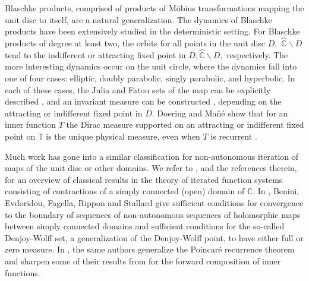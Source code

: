 \documentclass[12pt,reqno]{amsart}
\numberwithin{theorem}{section}
\begin{document}
Blaschke products, comprised of products of Möbius transformations mapping the unit disc to itself, are a natural generalization. The dynamics of Blaschke products have been extensively studied in the deterministic setting. For Blaschke products of degree at least two, the orbits for all points in the unit disc $D,$ $\hat{\mathbb{C}}\backslash\overline{D}$ tend to the indifferent or attracting fixed point in $\overline{D}, \hat{\mathbb{C}}\backslash D,$ respectively. The more interesting dynamics occur on the unit circle, where the dynamics fall into one of four cases: elliptic, doubly parabolic, singly parabolic, and hyperbolic. In each of these cases, the Julia and Fatou sets of the map  can be explicitly described \cite{baker_domains2, baker_domains,  parabolic, fletcher}, and an invariant measure can be constructed \cite{ergodic_inner_function, martin, expandPujals}, depending on the attracting or indifferent fixed point in $\overline{D}$. Doering and Mañé show that for an inner function $T$ the Dirac measure supported on an attracting or indifferent fixed point on $\mathbb{T}$ is the unique physical measure, even when $T$ is recurrent \cite{Mane1991}.

Much work has gone into a similar classification for non-autonomous iteration of maps of the unit disc or other domains. We refer to \cite{beardon, keen_lakic, lorentzen, lorentzen2}, and the references therein, for an overview of classical results in the theory of iterated function systems consisting of contractions of a simply connected (open) domain of $\mathbb{C}.$ In \cite{benini_1}, Benini, Evdoridou, Fagella, Rippon and Stallard give sufficient conditions for convergence to the boundary of sequences of non-autonomous sequences of holomorphic maps between simply connected domains and sufficient conditions for the so-called Denjoy-Wolff set, a generalization of the Denjoy-Wolff point, to have either full or zero measure. In \cite{benini2}, the same authors generalize the Poincaré recurrence theorem and sharpen some of their results from \cite{benini_1} for the forward composition of inner functions.
\end{document}
